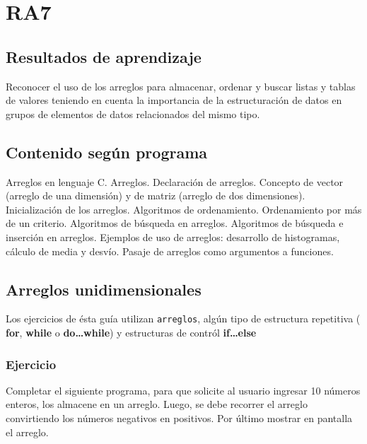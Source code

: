 \section{RA7}
\subsection*{Resultados de aprendizaje}
Reconocer el uso de los arreglos para almacenar, ordenar y buscar listas y tablas de valores teniendo en cuenta la importancia de la estructuración de datos en grupos de elementos de datos relacionados del mismo tipo.

\subsection*{Contenido según programa}
Arreglos en lenguaje C. Arreglos. Declaración de arreglos. Concepto de vector (arreglo de una dimensión) y de matriz (arreglo de dos dimensiones). Inicialización de los arreglos. Algoritmos de ordenamiento.  Ordenamiento por más de un criterio. Algoritmos de búsqueda en arreglos.  Algoritmos de búsqueda e inserción en arreglos.  Ejemplos de uso de arreglos: desarrollo de histogramas, cálculo de media y desvío. Pasaje de arreglos como argumentos a funciones.

\setcounter{subsection}{7}
\subsection*{Arreglos unidimensionales}

Los ejercicios de ésta guía utilizan \texttt{arreglos}, algún tipo de estructura repetitiva ( \textbf{for}, \textbf{while} o \textbf{do\dots while})
y estructuras de contról \textbf{if\dots else}

\subsubsection{Ejercicio}
Completar el siguiente programa, para que solicite al usuario ingresar 10 números enteros, los almacene en un arreglo. Luego, se debe recorrer el arreglo convirtiendo los números negativos en positivos. Por último mostrar en pantalla el arreglo.
\lstset{inputencoding=utf8/latin1}

{\small
  \lstset{inputencoding=utf8/latin1}
  
}

